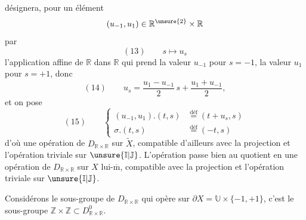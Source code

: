 désignera, pour un élément
\[
(u_{-1},u_1)\in\mathbb R^{\unsure{2}}\times\mathbb R
\]
par
\[
(13)\qquad s\longmapsto u_s
\]
l'application affine de $\mathbb R$ dans $\mathbb R$  qui prend la valeur $u_{-1}$ pour $s=-1$, la valeur $u_1$ pour $s=+1$,  donc
\[
(14)\qquad u_s=\frac{u_1-u_{-1}}2\,s+\frac{u_1+u_{-1}}2,
\]
et on pose
\[
(15)\qquad\left\{\begin{aligned}
(u_{-1},u_1).(t,s)&\overset{\text{déf}}{=}(t+u_s,s)\\
\sigma.(t,s)&\overset{\text{déf}}{=}(-t,s)
\end{aligned}\right.
\]
d'où une opération de $D_{\mathbb R\times\mathbb R}$ sur $\widetilde X$, compatible d'ailleurs avec la  projection
et l'opération triviale sur $\unsure{\mathbb I|\mathbb J}$. L'opération passe bien au quotient en une opération de $D_{\mathbb R\times\mathbb R}$ sur $X$ lui-$\overline{\mathrm m}$, compatible avec la projection
et l'opération triviale sur $\unsure{\mathbb I|\mathbb J}$.

Considérons le sous-groupe de $D_{\mathbb R\times\mathbb R}$ qui opère  sur $\partial X=\mathbb U\times\{-1,+1\}$, c'est le sous-groupe $\mathbb Z\times\mathbb Z\subset D_{\mathbb R\times\mathbb R}^{0}$.
